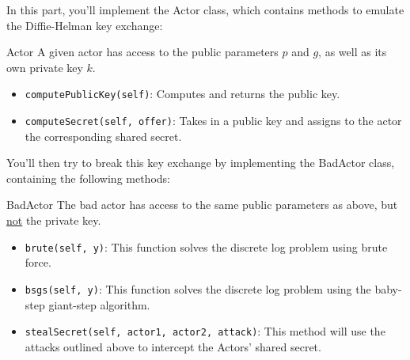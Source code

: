 \documentclass{article}
\begin{document}
    \begin{tcolorbox}[enhanced,interior style={top color=Plum!20,bottom color=Plum!30}]
        In this part, you'll implement the Actor class, which contains methods to emulate the Diffie-Helman key exchange:
    
        \begin{mybox}[
            colframe=Cerulean!50!black,
            colback=Cerulean!30,
            colbacktitle=Cerulean!,
            coltitle=Cerulean!30!black
            ]{Actor}
            A given actor has access to the public parameters $p$ and $g$, as well as its own private key $k$.
            \begin{itemize}
                \item \lstinline{computePublicKey(self)}: Computes and returns the public key.
                \item \lstinline{computeSecret(self, offer)}: Takes in a public key and assigns to the actor the corresponding shared secret.
            \end{itemize}
    
        \end{mybox}
    
        You'll then try to break this key exchange by implementing the BadActor class, containing the following methods:
    
        \begin{mybox}[
            colframe=purple!50!black,
            colback=purple!40,
            colbacktitle=purple!50!white,
            coltitle=purple!30!black,
            ]{BadActor}
            The bad actor has access to the same public parameters as above, but \underline{not} the private key.
            \begin{itemize}
                \item \lstinline{brute(self, y)}: This function solves the discrete log problem using brute force.
                \item \lstinline{bsgs(self, y)}: This function solves the discrete log problem using the baby-step giant-step algorithm.
                \item \lstinline{stealSecret(self, actor1, actor2, attack)}: This method will use the attacks outlined above to intercept the Actors' shared secret.
            \end{itemize}
        \end{mybox}
    

\end{tcolorbox}
\end{document}
